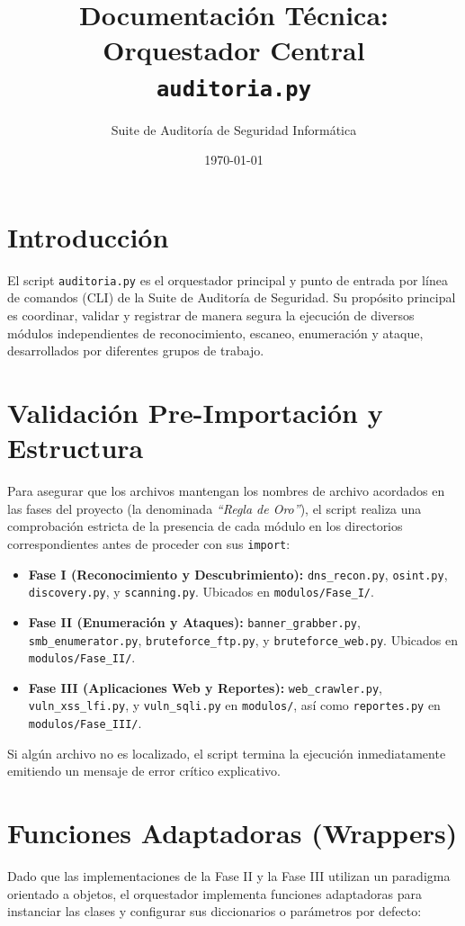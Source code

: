 \documentclass[12pt,a4paper]{article}
\title{\textbf{Documentación Técnica: Orquestador Central} \\ \large \texttt{auditoria.py}}
\author{Suite de Auditoría de Seguridad Informática}
\date{\today}
\begin{document}
\maketitle

\section{Introducción}
El script \texttt{auditoria.py} es el orquestador principal y punto de entrada por línea de comandos (CLI) de la Suite de Auditoría de Seguridad. Su propósito principal es coordinar, validar y registrar de manera segura la ejecución de diversos módulos independientes de reconocimiento, escaneo, enumeración y ataque, desarrollados por diferentes grupos de trabajo.

\section{Validación Pre-Importación y Estructura}
Para asegurar que los archivos mantengan los nombres de archivo acordados en las fases del proyecto (la denominada \textit{``Regla de Oro''}), el script realiza una comprobación estricta de la presencia de cada módulo en los directorios correspondientes antes de proceder con sus \texttt{import}:

\begin{itemize}
    \item \textbf{Fase I (Reconocimiento y Descubrimiento):} \texttt{dns\_recon.py}, \texttt{osint.py}, \texttt{discovery.py}, y \texttt{scanning.py}. Ubicados en \texttt{modulos/Fase\_I/}.
    \item \textbf{Fase II (Enumeración y Ataques):} \texttt{banner\_grabber.py}, \texttt{smb\_enumerator.py}, \texttt{bruteforce\_ftp.py}, y \texttt{bruteforce\_web.py}. Ubicados en \texttt{modulos/Fase\_II/}.
    \item \textbf{Fase III (Aplicaciones Web y Reportes):} \texttt{web\_crawler.py}, \texttt{vuln\_xss\_lfi.py}, y \texttt{vuln\_sqli.py} en \texttt{modulos/}, así como \texttt{reportes.py} en \texttt{modulos/Fase\_III/}.
\end{itemize}

Si algún archivo no es localizado, el script termina la ejecución inmediatamente emitiendo un mensaje de error crítico explicativo.

\section{Funciones Adaptadoras (Wrappers)}
Dado que las implementaciones de la Fase II y la Fase III utilizan un paradigma orientado a objetos, el orquestador implementa funciones adaptadoras para instanciar las clases y configurar sus diccionarios o parámetros por defecto:
\end{document}
